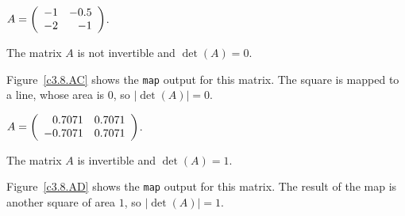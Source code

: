 \documentclass{ximera}
\begin{document}
\begin{computerExercise}  \label{c3.8.AC}
$A=\left(\begin{array}{rr} -1 & -0.5\\ -2 &-1\end{array}\right)$.

\begin{solution}
\ans The matrix $A$ is not invertible and $\det(A) = 0$.

\soln Figure~\ref{c3.8.AC} shows the {\tt map} output for this matrix.
The square is mapped to a line, whose area is $0$, so $|\det(A)| = 0$.

\end{solution}
\end{computerExercise}

\begin{computerExercise}  \label{c3.8.AD}
$A=\left(\begin{array}{rr} 0.7071 & 0.7071\\ -0.7071 &0.7071\end{array}\right)$.

\begin{solution}
\ans The matrix $A$ is invertible and $\det(A) = 1$.

\soln Figure~\ref{c3.8.AD} shows the {\tt map} output for this matrix.
The result of the map is another square of area $1$, so $|\det(A)| = 1$.
\end{solution}

\end{computerExercise}
\end{document}
